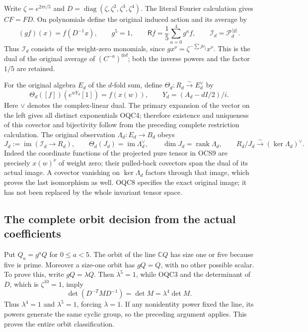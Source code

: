 \documentclass[11pt,a4paper]{article}
\begin{document}
Write $\zeta=e^{2\pi i/5}$ and
$D=\operatorname{diag}(\zeta,\zeta^2,\zeta^3,\zeta^4)$.
The literal Fourier calculation gives $CF=FD$. On polynomials
define the original induced action and its average by
\[
 (g f)(x)=f(D^{-1}x),\qquad g^5=1,\qquad
 \mathsf R f=\frac15\sum_{a=0}^4g^af,
 \qquad \mathscr I_d=\mathscr P_d^{\langle g\rangle}.
 \tag{OQC6}
\]
Thus $\mathscr I_d$ consists of the weight-zero monomials, since
$gx^\nu=\zeta^{-\sum j\nu_j}x^\nu$. This is the dual of the
original average of $(C^{-a})^{\otimes d}$; both the inverse powers
and the factor $1/5$ are retained.

For the original algebra $E_d$ of the $d$-fold sum, define
$\Theta_d:R_d\xrightarrow{\sim}E_d^\vee$ by
\[
 \Theta_d([f])(e^{wY_d}[1])=f(x(w)),\qquad
       Y_d=(A_d-dI/2)/i.
 \tag{OQC7}
\]
Here $\vee$ denotes the complex-linear dual. The primary expansion
of the vector on the left gives all distinct exponentials OQC4;
therefore existence and uniqueness of this covector and bijectivity
follow from the preceding complete restriction calculation. The
original observation $\Lambda_d:E_d\to B_d$ obeys
\[
 J_d:=\operatorname{im}(\mathscr I_d\to R_d),\qquad
 \Theta_d(J_d)=\operatorname{im}\Lambda_d^\vee,
 \qquad \dim J_d=\operatorname{rank}\Lambda_d,
 \qquad R_d/J_d\xrightarrow{\sim}(\ker\Lambda_d)^\vee.
 \tag{OQC8}
\]
Indeed the coordinate functions of the projected pure tensor in
OCS9 are precisely $x(w)^\nu$ of weight zero; their pulled-back
covectors span the dual of its actual image. A covector vanishing
on $\ker\Lambda_d$ factors through that image, which proves the
last isomorphism as well. OQC8 specifies the exact original image;
it has not been replaced by the whole invariant tensor space.

\subsection{The complete orbit decision from the actual coefficients}
Put $Q_a=g^aQ$ for $0\leq a<5$. The orbit of the line $\mathbb C Q$
has size one or five because five is prime. Moreover a size-one
orbit has $gQ=Q$, with no other possible scalar. To prove this, write
$gQ=\lambda Q$. Then $\lambda^5=1$, while OQC3 and the determinant
of $D$, which is $\zeta^{10}=1$, imply
\[
 \det(D^{-T}MD^{-1})=\det M=\lambda^4\det M.
 \tag{OQC9}
\]
Thus $\lambda^4=1$ and $\lambda^5=1$, forcing $\lambda=1$.
If any nonidentity power fixed the line, its powers generate the
same cyclic group, so the preceding argument applies. This proves
the entire orbit classification.
\end{document}
